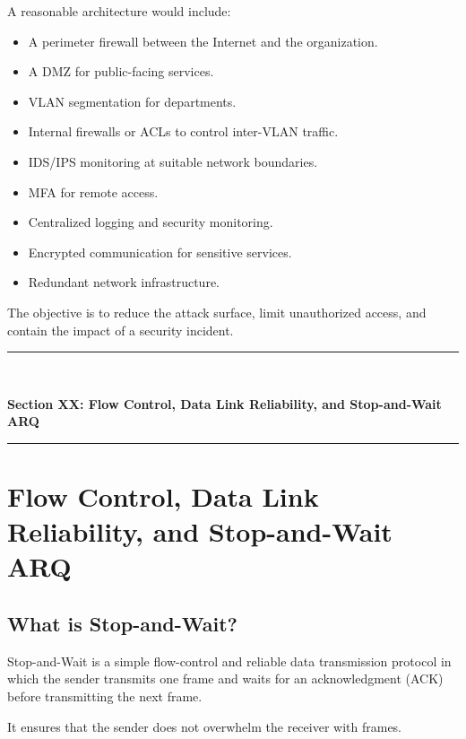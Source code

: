 A reasonable architecture would include:

\begin{itemize}
\item A perimeter firewall between the Internet and the organization.
\item A DMZ for public-facing services.
\item VLAN segmentation for departments.
\item Internal firewalls or ACLs to control inter-VLAN traffic.
\item IDS/IPS monitoring at suitable network boundaries.
\item MFA for remote access.
\item Centralized logging and security monitoring.
\item Encrypted communication for sensitive services.
\item Redundant network infrastructure.
\end{itemize}

The objective is to reduce the attack surface, limit unauthorized access, and contain the impact of a security incident.


\newpage
\begin{center}
\vspace{0.5em}
{\color{primary}\rule{0.45\textwidth}{1.2pt}\\[4pt]}
{\Large\bfseries\color{primary} Section XX: Flow Control, Data Link Reliability, and Stop-and-Wait ARQ\\[2pt]}
{\color{primary}\rule{0.45\textwidth}{1.2pt}}
\vspace{0.5em}
\end{center}

\section{Flow Control, Data Link Reliability, and Stop-and-Wait ARQ}



\subsection{What is Stop-and-Wait?}

Stop-and-Wait is a simple flow-control and reliable data transmission protocol in which the sender transmits one frame and waits for an acknowledgment (ACK) before transmitting the next frame.

It ensures that the sender does not overwhelm the receiver with frames.


